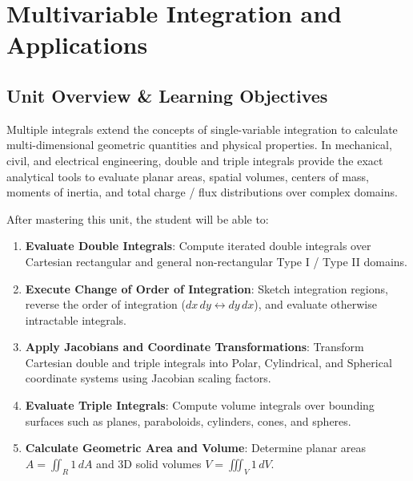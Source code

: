 \chapter{Multivariable Integration and Applications}
\label{chap:multivariable-integration}

\section{Unit Overview \& Learning Objectives}

Multiple integrals extend the concepts of single-variable integration to calculate multi-dimensional geometric quantities and physical properties. In mechanical, civil, and electrical engineering, double and triple integrals provide the exact analytical tools to evaluate planar areas, spatial volumes, centers of mass, moments of inertia, and total charge / flux distributions over complex domains.

\begin{important}
After mastering this unit, the student will be able to:
\begin{enumerate}[leftmargin=1.5em]
    \item \textbf{Evaluate Double Integrals}: Compute iterated double integrals over Cartesian rectangular and general non-rectangular Type I / Type II domains.
    \item \textbf{Execute Change of Order of Integration}: Sketch integration regions, reverse the order of integration ($dx\,dy \leftrightarrow dy\,dx$), and evaluate otherwise intractable integrals.
    \item \textbf{Apply Jacobians and Coordinate Transformations}: Transform Cartesian double and triple integrals into Polar, Cylindrical, and Spherical coordinate systems using Jacobian scaling factors.
    \item \textbf{Evaluate Triple Integrals}: Compute volume integrals over bounding surfaces such as planes, paraboloids, cylinders, cones, and spheres.
    \item \textbf{Calculate Geometric Area and Volume}: Determine planar areas $A = \iint_R 1\,dA$ and 3D solid volumes $V = \iiint_V 1\,dV$.
\end{enumerate}
\end{important}

